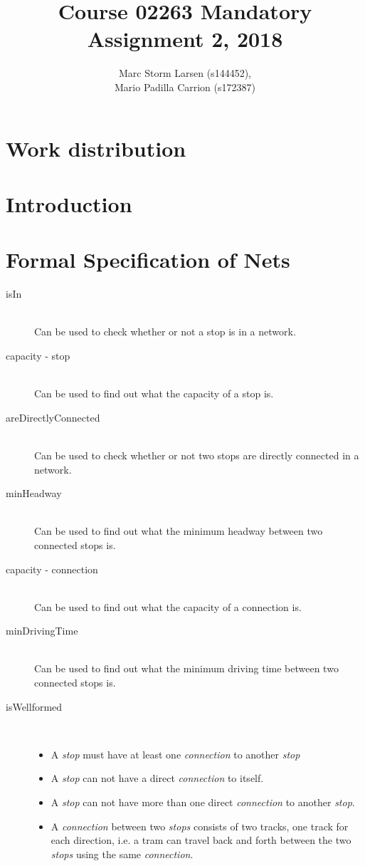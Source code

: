 \documentclass[a4]{article}
\title{Course 02263 Mandatory Assignment 2, 2018}
\author{Marc Storm Larsen (s144452),\\ 
        Mario Padilla Carrion (s172387)}
\begin{document}
\maketitle

\tableofcontents
\newpage

\section{Work distribution}

\section{Introduction}

\section{Formal Specification of Nets}





\begin{description}
    \item[isIn] \hfill \\ Can be used to check whether or not a stop is in a network.
    \item[capacity - stop] \hfill \\ Can be used to find out what the capacity of a stop is.
    \item[areDirectlyConnected] \hfill \\ Can be used to check whether or not two stops are directly connected in a network.
    \item[minHeadway] \hfill \\ Can be used to find out what the minimum headway between two connected stops is.
    \item[capacity - connection] \hfill \\ Can be used to find out what the capacity of a connection is.
    \item[minDrivingTime] \hfill \\ Can be used to find out what the minimum driving time between two connected stops is.
    \item[isWellformed] \hfill \\ 
        \begin{itemize}
            \item A \emph{stop} must have at least one \emph{connection} to another \emph{stop}
            \item A \emph{stop} can not have a direct \emph{connection} to itself.
            \item A \emph{stop} can not have more than one direct \emph{connection} to another \emph{stop}.
            \item A \emph{connection} between two \emph{stops} consists of two tracks, one track for each direction, i.e. a tram can travel back and forth between the two \emph{stops} using the same \emph{connection}.
        \end{itemize}
\end{description}
\end{document}
